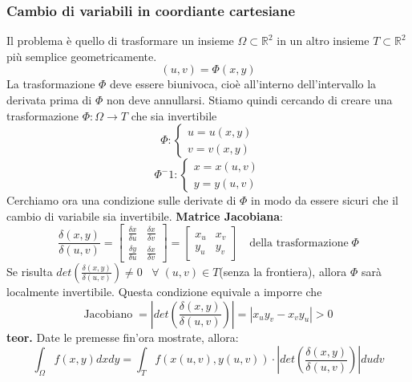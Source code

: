 \subsubsection{Cambio di variabili in coordiante cartesiane}
Il problema è quello di trasformare un insieme $\Omega \subset \mathbb{R}^2$ in un altro insieme $T \subset \mathbb{R}^2$ più semplice geometricamente.
\[
    (u,v) = \Phi(x,y)   
\] 
La trasformazione $\Phi$ deve essere biunivoca, cioè all'interno dell'intervallo la derivata prima di $\Phi$ non deve annullarsi.\newline
Stiamo quindi cercando di creare una trasformazione $\Phi: \Omega \rightarrow T$ che sia invertibile
\[
    \Phi : \begin{cases}
        u = u(x,y)\\
        v = v(x,y)
    \end{cases}
\]
\[
    \Phi^-1 : \begin{cases}
        x = x(u,v)\\
        y = y(u,v)
    \end{cases}
\]
Cerchiamo ora una condizione sulle derivate di $\Phi$ in modo da essere sicuri che il cambio di variabile sia invertibile.\newline
\newline
\textbf{Matrice Jacobiana}:
\[
    \frac{\delta(x,y)}{\delta(u,v)} = \left[\begin{matrix}
        \frac{\delta x}{ \delta u} & \frac{\delta x}{ \delta v}\\
        \frac{\delta y}{\delta u} & \frac{\delta x}{ \delta v}
    \end{matrix}\right] = \left[\begin{matrix}
        x_u & x_v\\
        y_u & y_v
    \end{matrix}\right] \quad \text{della trasformazione}\;\Phi
\]
Se risulta $det\left(\frac{\delta(x,y)}{\delta(u,v)}\right) \neq 0 \;\; \;\forall\;(u,v) \in T$(senza la frontiera), allora $\Phi$ sarà localmente invertibile. \newline
\newline
Questa condizione equivale a imporre che
\[
    \text{Jacobiano}\; = \left|det\left(\frac{\delta(x,y)}{\delta(u,v)}\right)\right| = |x_u y_v - x_v y_u| > 0
\]
\newline
\textbf{teor.} Date le premesse fin'ora mostrate, allora:
\[
    \int_\Omega f(x,y) dx dy = \int_T f(x(u,v), y(u,v)) \cdot \left|det\left(\frac{\delta(x,y)}{\delta(u,v)}\right)\right| du dv
\]
